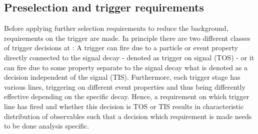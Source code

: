 \subsection{Preselection and trigger requirements}
\label{sec:preselTrigger}

Before applying further selection requirements to reduce the background, requirements on the trigger are made.
In principle there are two different classes of trigger decisions at \lhcb: A trigger can fire due to a particle or event property directly connected to the signal decay - denoted as trigger on signal (TOS) - or it can fire due to some property separate to the signal decay what is denoted as a decision independent of the signal (TIS).
Furthermore, each trigger stage has various lines, triggering on different event properties and thus being differently effective depending on the specific decay.
Hence, a requirement on which trigger line has fired and whether this decision is TOS or TIS results in characteristic distribution of observables such that a decision which requirement is made needs to be done analysis specific.

